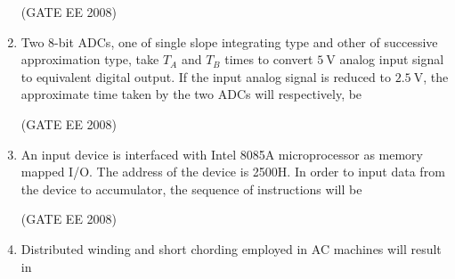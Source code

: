 \documentclass[journal,12pt,onecolumn]{IEEEtran}
\theoremstyle{remark}
\begin{document}
\begin{enumerate}[start=1, label=Q.\arabic*]
\begin{enumerate}[label=(\Alph*)]
\end{enumerate}
\hfill (GATE EE 2008)





\item Two 8-bit ADCs, one of single slope integrating type and other of successive approximation type, 
take $T_A$ and $T_B$ times to convert $5 \ \mathrm{V}$ analog input signal to equivalent digital output. 
If the input analog signal is reduced to $2.5 \ \mathrm{V}$, the approximate time taken by the two ADCs will respectively, be

\begin{enumerate}[label=(\Alph*)]
\end{enumerate}
\hfill (GATE EE 2008)





\item An input device is interfaced with Intel 8085A microprocessor as memory mapped I/O. 
The address of the device is {2500H}. In order to input data from the device to accumulator, 
the sequence of instructions will be

\begin{enumerate}[label=(\Alph*)]
\end{enumerate}
\hfill (GATE EE 2008)



\item Distributed winding and short chording employed in AC machines will result in


\end{enumerate}
\end{document}
